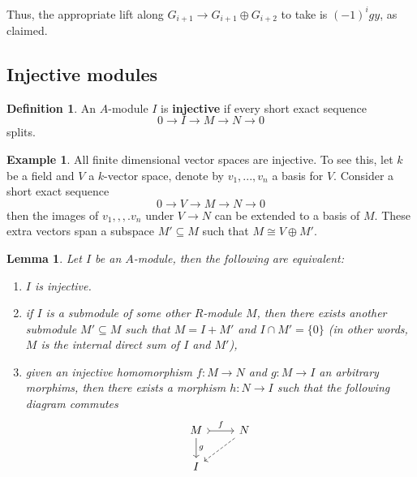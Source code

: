 \documentclass[12pt]{article}
\theoremstyle{plain}
\newtheorem{lemma}[thm]{Lemma}
\theoremstyle{definition}
\newtheorem{defn}[thm]{Definition} %
\newtheorem{example}[thm]{Example}
\newcommand{\lto}{\longrightarrow}
\begin{document}
Thus, the appropriate lift along $G_{i+1} \lto G_{i+1} \oplus G_{i+2}$ to take is $(-1)^i gy$, as claimed.






\subsection{Injective modules}
\begin{defn}
An $A$-module $I$ is \textbf{injective} if every short exact sequence
\begin{equation}
0 \lto I \lto M \lto N \lto 0
\end{equation}
splits.
\end{defn}
\begin{example}
All finite dimensional vector spaces are injective. To see this, let $k$ be a field and $V$ a $k$-vector space, denote by $v_1,...,v_n$ a basis for $V$. Consider a short exact sequence
\begin{equation}
0 \lto V \lto M \lto N \lto 0
\end{equation}
then the images of $v_1,,,.v_n$ under $V \lto N$ can be extended to a basis of $M$. These extra vectors span a subspace $M' \subseteq M$ such that $M \cong V \oplus M'$.
\end{example}
\begin{lemma}\label{lem:inj_mod_defs}
Let $I$ be an $A$-module, then the following are equivalent:
\begin{enumerate}
\item\label{lem:inj_mod_defs_def} $I$ is injective.
\item\label{lem:inj_mod_defs_internal} if $I$ is a submodule of some other $R$-module $M$, then there exists another submodule $M' \subseteq M$ such that $M = I + M'$ and $I \cap M' = \lbrace 0 \rbrace$ (in other words, $M$ is the internal direct sum of $I$ and $M'$),
\item\label{lem:inj_mod_defs_morphism} given an injective homomorphism $f: M \lto N$ and $g: M \lto I$ an arbitrary morphims, then there exists a morphism $h: N \lto I$ such that the following diagram commutes
\begin{equation}
\begin{tikzcd}
M\arrow[d,"g"]\arrow[r,rightarrowtail,"f"] & N\arrow[dl,dashed]\\
I
\end{tikzcd}
\end{equation}
\end{enumerate}
\end{lemma}
\end{document}
